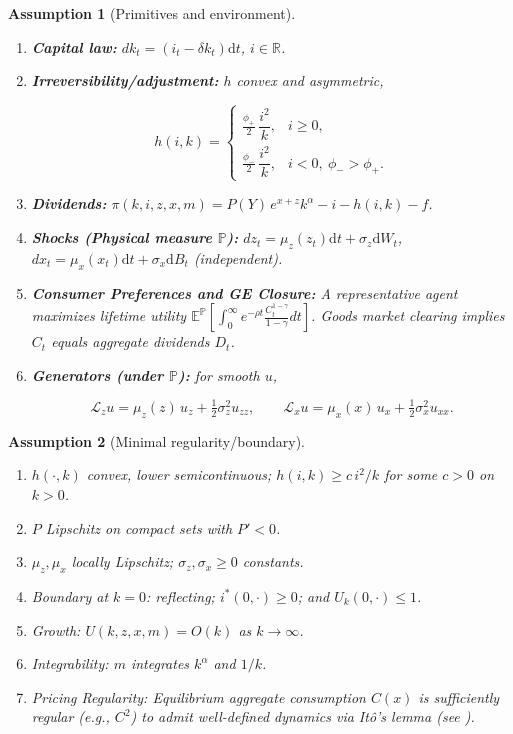 \documentclass[11pt,letterpaper,oneside]{article}
\newcommand{\YY}{Y}%
\newtheorem{assumptionT}{Assumption}
\newenvironment{assumption}[2]{\begin{assumptionT}[#1]\label{ass:#2}}{\end{assumptionT}}
\newcommand{\E}{\mathbb{E}}
\newcommand{\R}{\mathbb{R}}
\newcommand{\diff}{\mathrm{d}}
\newcommand{\Lx}{\mathcal{L}_x}
\newcommand{\Lz}{\mathcal{L}_z}
\begin{document}
\begin{assumption}{Primitives and environment}{primitives}
\begin{enumerate}[leftmargin=1.25em]
\item \textbf{Capital law:} $dk_t=(i_t-\delta k_t)\diff t$, $i\in\R$.
\item \textbf{Irreversibility/adjustment:} $h$ convex and asymmetric,

$$
h(i,k)=
\begin{cases}
\tfrac{\phi_+}{2}\,\dfrac{i^2}{k}, & i\ge 0,\\[3pt]
\tfrac{\phi_-}{2}\,\dfrac{i^2}{k}, & i<0,\ \phi_->\phi_+.
\end{cases}
$$

\item \textbf{Dividends:} $\pi(k,i,z,x,m)=P(\YY)\,e^{x+z}k^\alpha - i - h(i,k) - f$.
\item \textbf{Shocks (Physical measure $\mathbb{P}$):} $dz_t=\mu_z(z_t)\diff t+\sigma_z\diff W_t$, $dx_t=\mu_x(x_t)\diff t+\sigma_x\diff B_t$ (independent).
\item \textbf{Consumer Preferences and GE Closure:} A representative agent maximizes lifetime utility $\E^{\mathbb{P}}\left[\int_0^\infty e^{-\rho t} \frac{C_t^{1-\gamma}}{1-\gamma} dt\right]$. Goods market clearing implies $C_t$ equals aggregate dividends $D_t$.
\item \textbf{Generators (under $\mathbb{P}$):} for smooth $u$,

$$
\Lz u=\mu_z(z)\,u_z+\tfrac12\sigma_z^2 u_{zz},\qquad
\Lx u=\mu_x(x)\,u_x+\tfrac12\sigma_x^2 u_{xx}.
$$

\end{enumerate}
\end{assumption}

\begin{assumption}{Minimal regularity/boundary}{regularity}
\begin{enumerate}[label=(\alph*),itemsep=0.2em]
\item $h(\cdot,k)$ convex, lower semicontinuous; $h(i,k)\ge c\,i^2/k$ for some $c>0$ on $k>0$.
\item $P$ Lipschitz on compact sets with $P'<0$.
\item $\mu_z,\mu_x$ locally Lipschitz; $\sigma_z,\sigma_x\ge 0$ constants.
\item \emph{Boundary at $k=0$:} reflecting; $i^*(0,\cdot)\ge 0$; and $U_k(0,\cdot)\le 1$.
\item \emph{Growth:} $U(k,z,x,m)=O(k)$ as $k\to\infty$.
\item \emph{Integrability:} $m$ integrates $k^\alpha$ and $1/k$.
\item \emph{Pricing Regularity:} Equilibrium aggregate consumption $C(x)$ is sufficiently regular (e.g., $C^2$) to admit well-defined dynamics via Itô's lemma (see ).
\end{enumerate}
\end{assumption}
\end{document}
